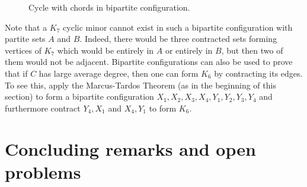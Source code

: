 \documentclass[11pt]{article}
\begin{document}
\begin{figure}[!h]
\begin{tikzpicture}[scale=0.5]
\end{tikzpicture}
    \caption{Cycle with chords in bipartite configuration.}
    \label{fig_bipk7}
\end{figure}


Note that a $K_7$ cyclic minor cannot exist in such a bipartite configuration with partite sets $A$ and $B$. Indeed, there would be three contracted sets forming vertices of $K_7$ which would be entirely in $A$ or entirely in $B$, but then two of them would not be adjacent. Bipartite configurations can also be used to prove that if $C$ has large average degree, then one can form $K_6$ by contracting its edges. To see this, apply the Marcus-Tardos Theorem (as in the beginning of this section) to form a bipartite configuration $X_1,X_2,X_3,X_4,Y_1,Y_2,Y_3,Y_4$ and furthermore contract $Y_4,X_1$ and $X_4,Y_1$ to form $K_6$. 





\section{Concluding remarks and open problems}
\label{sec:open}
\end{document}
